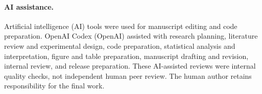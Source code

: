 \paragraph{AI assistance.} Artificial intelligence (AI) tools were used for manuscript editing and code preparation. OpenAI Codex (OpenAI) assisted with research planning, literature review and experimental design, code preparation, statistical analysis and interpretation, figure and table preparation, manuscript drafting and revision, internal review, and release preparation. These AI-assisted reviews were internal quality checks, not independent human peer review. The human author retains responsibility for the final work.
